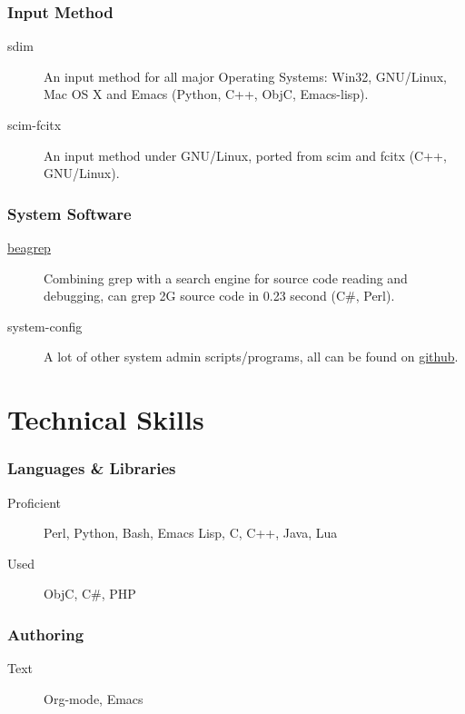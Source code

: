 \documentclass[11pt]{article}
\begin{document}
\begin{CJK*}{UTF8}{simsun}
\subsubsection{Input Method}
\label{sec-2-0-3}
\begin{description}
\item[{sdim}] An input method for all major Operating Systems: Win32,
GNU/Linux, Mac OS X and Emacs (Python, C++, ObjC,
Emacs-lisp).

\item[{scim-fcitx}] An input method under GNU/Linux, ported from scim
and fcitx (C++, GNU/Linux).
\end{description}

\subsubsection{System Software}
\label{sec-2-0-4}

\begin{description}
\item[{\href{https://github.com/baohaojun/beagrep}{beagrep}}] Combining grep with a search engine for source code
reading and debugging, can grep 2G source code in 0.23
second (C\#, Perl).

\item[{system-config}] A lot of other system admin scripts/programs, all
can be found on \href{https://github.com/baohaojun}{github}.
\end{description}


\section{Technical Skills}
\label{sec-3}

\subsubsection{Languages \& Libraries}
\label{sec-3-0-1}
\begin{description}
\item[{Proficient}] Perl, Python, Bash, Emacs Lisp, C, C++, Java, Lua

\item[{Used}] ObjC, C\#, PHP
\end{description}
\subsubsection{Authoring}
\label{sec-3-0-2}
\begin{description}
\item[{Text}] Org-mode, Emacs
\end{description}

\end{CJK*}
\end{document}
